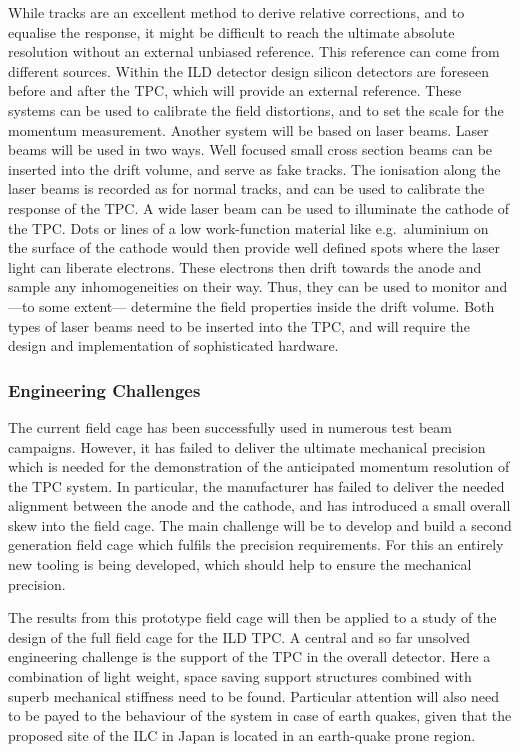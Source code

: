 While tracks are an excellent method to derive relative corrections, and to equalise the response, it might be difficult to reach the ultimate absolute resolution without an external unbiased reference. This reference can come from different sources. Within the ILD detector design silicon detectors are foreseen before and after the TPC, which will provide an external reference. These systems can be used to calibrate the field distortions, and to set the scale for the momentum measurement. Another system will be based on laser beams. Laser beams will be used in two ways. Well focused small cross section beams can be inserted into the drift volume, and serve as fake tracks. The ionisation along the laser beams is recorded as for normal tracks, and can be used to calibrate the response of the TPC. A wide laser beam can be used to illuminate the cathode of the TPC. Dots or lines of a low work-function material like e.g.~aluminium on the surface of the cathode would then provide well defined spots where the laser
light can liberate electrons. These electrons then drift towards the anode and sample any inhomogeneities on their way. Thus, they can be used to monitor and ---to some extent--- determine the field properties inside the drift volume. Both types of laser beams need to be inserted into the TPC, and will require the design and implementation of sophisticated hardware.

\subsubsection{Engineering Challenges}
The current field cage has been successfully used in numerous test beam campaigns. However, it has failed to deliver the ultimate mechanical precision which is needed for the demonstration of the anticipated momentum resolution of the TPC system. In particular, the manufacturer has failed to deliver the needed alignment between the anode and the cathode, and has introduced a small overall skew into the field cage. The main challenge will be to develop and build a second generation field cage which fulfils the precision requirements. For this an entirely new tooling is being developed, which should help to ensure the mechanical precision.

The results from this prototype field cage will then be applied to a study of the design of the full field cage for the ILD TPC. A central and so far unsolved engineering challenge is the support of the TPC in the overall detector. Here a combination of light weight, space saving support structures combined with superb mechanical stiffness need to be found. Particular attention will also need to be payed to the behaviour of the system in case of earth quakes, given that the proposed site of the ILC in Japan is located in an earth-quake prone region.

